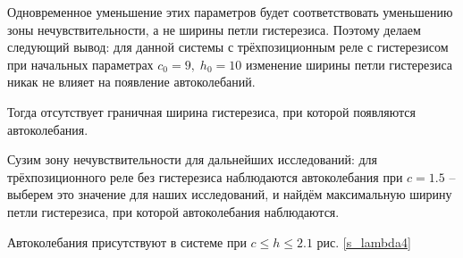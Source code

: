 	Одновременное уменьшение этих параметров будет соответствовать уменьшению зоны нечувствительности, а не ширины петли гистерезиса. Поэтому делаем следующий вывод: для данной системы с трёхпозиционным реле с гистерезисом при начальных параметрах $c_0 = 9,\;h_0=10$ изменение ширины петли гистерезиса никак не влияет на появление автоколебаний.
	
	Тогда отсутствует граничная ширина гистерезиса, при которой появляются автоколебания. 
	
	Сузим зону нечувствительности для дальнейших исследований: для трёхпозиционного реле без гистерезиса наблюдаются автоколебания при $c=1.5$ -- выберем это значение для наших исследований, и найдём максимальную ширину петли гистерезиса, при которой автоколебания наблюдаются.
	
	Автоколебания присутствуют в системе при $c\leq h \leq 2.1$ рис. \ref{s_lambda4}
	
	
